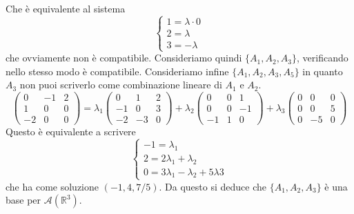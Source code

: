 Che è equivalente al sistema
\begin{equation*}
  \begin{cases}
    1=\lambda\cdot0\\
    2=\lambda\\
    3=-\lambda
  \end{cases}
\end{equation*}
che ovviamente non è compatibile. Consideriamo quindi $\{A_1,A_2,A_3\}$, verificando
nello stesso modo è compatibile. Consideriamo infine $\{A_1,A_2,A_3,A_5\}$ in quanto
$A_3$ non puoi scriverlo come combinazione lineare di $A_1$ e $A_2$.
\begin{equation*}
  \begin{pmatrix}
    0 & -1 & 2\\
    1 & 0 & 0\\
    -2 & 0 & 0
  \end{pmatrix} =
  \lambda_1
  \begin{pmatrix}
    0 & 1 & 2\\
    -1 & 0 & 3\\
    -2 & -3 & 0
  \end{pmatrix}
  +\lambda_2
  \begin{pmatrix}
    0 & 0 & 1\\
    0 & 0 & -1\\
    -1 & 1 & 0
  \end{pmatrix}
  +\lambda_3
  \begin{pmatrix}
    0 & 0 & 0\\
    0 & 0 & 5\\
    0 & -5 & 0
  \end{pmatrix}
\end{equation*}
Questo è equivalente a scrivere
\begin{equation*}
  \begin{cases}
    -1=\lambda_1\\
    2=2\lambda_1+\lambda_2\\
    0=3\lambda_1-\lambda_2+5\lambda3
  \end{cases}
\end{equation*}
che ha come soluzione $(-1,4,7/5)$. Da questo si deduce che $\{A_1,A_2,A_3\}$ è una base
per $\mathscr{A}(\mathbb{R}^3)$.
